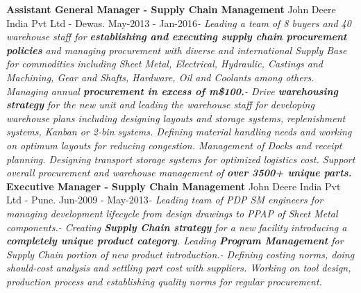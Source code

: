 \documentclass[11pt, a4paper]{awesome-cv}
\begin{document}
\textbf{Assistant General Manager - Supply Chain Management} \hfill John
Deere India Pvt Ltd - Dewas\newline . \hfill May-2013 -
Jan-2016\newline \textit{- \hspace{5mm}  Leading a team of 8 buyers and 40 warehouse staff for \textbf{establishing and executing supply chain procurement policies} and managing procurement with diverse and international Supply Base for commodities including Sheet Metal, Electrical, Hydraulic, Castings and Machining, Gear and Shafts, Hardware, Oil and Coolants among others. Managing annual \textbf{procurement in excess of m\$100.}\newline - \hspace{5mm}  Drive \textbf{warehousing strategy} for the new unit and leading the warehouse staff for developing warehouse plans including designing layouts and storage systems, replenishment systems, Kanban or 2-bin systems. Defining material handling needs and working on optimum layouts for reducing congestion. Management of Docks and receipt planning. Designing transport storage systems for optimized logistics cost. Support overall procurement and warehouse management of \textbf{over 3500+ unique parts.}}
\newline \vspace{2mm} \newline
\textbf{Executive Manager - Supply Chain Management} \hfill John Deere
India Pvt Ltd - Pune\newline . \hfill Jun-2009 -
May-2013\newline \textit{- \hspace{5mm}  Leading team of PDP SM engineers for managing development lifecycle from design drawings to PPAP of Sheet Metal components.\newline - \hspace{5mm}  Creating \textbf{Supply Chain strategy} for a new facility introducing a \textbf{completely unique product category}. Leading \textbf{Program Management} for Supply Chain portion of new product introduction.\newline - \hspace{5mm}  Defining costing norms, doing should-cost analysis and settling part cost with suppliers. Working on tool design, production process and establishing quality norms for regular procurement.}
\newline \vspace{2mm} \newline
\end{document}
